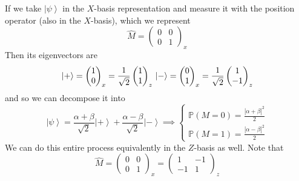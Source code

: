 \documentclass{article}
\newcommand{\ket}[1]{\ensuremath{\left|#1\right\rangle}}
\newcounter{example}[section]
\begin{document}
    \begin{example}
      \label{ex:measuring-in-the-x-basis}
 
      If we take $\ket{\psi}$ in the $X$-basis representation and measure it with the position operator (also in the $X$-basis), which we represent 
      \begin{equation} 
        \hat{M} = \begin{pmatrix} 0 & 0 \\ 0 & 1 \end{pmatrix}_x
      \end{equation} 
      Then its eigenvectors are 
      \begin{equation} 
        \ket{+} = \begin{pmatrix} 1 \\ 0 \end{pmatrix}_x = \frac{1}{\sqrt{2}} \begin{pmatrix} 1 \\ 1 \end{pmatrix}_z \\ 
        \ket{-} = \begin{pmatrix} 0 \\ 1 \end{pmatrix}_x = \frac{1}{\sqrt{2}} \begin{pmatrix} 1 \\ -1 \end{pmatrix}_z 
      \end{equation}
      and so we can decompose it into 
      \begin{equation} 
        \ket{\psi} = \frac{\alpha + \beta}{\sqrt{2}} \ket{+} + \frac{\alpha - \beta}{\sqrt{2}} \ket{-} \implies \begin{cases} \mathbb{P}(M = 0) = \frac{|\alpha + \beta|^2}{2} \\ \mathbb{P}(M = 1) = \frac{|\alpha - \beta|^2}{2} \end{cases}
      \end{equation}
      We can do this entire process equivalently in the $Z$-basis as well. Note that 
      \begin{equation} 
        \hat{M} = \begin{pmatrix} 0 & 0 \\ 0 & 1 \end{pmatrix}_x = \begin{pmatrix} 1 & -1 \\ -1 & 1 \end{pmatrix}_z
      \end{equation}

\end{example}
\end{document}
